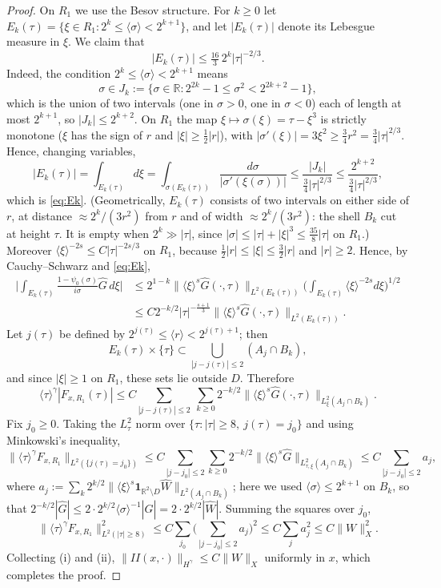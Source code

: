 \documentclass[10pt,a4paper]{amsart}
\newcommand{\R}{\mathbb R}
\newcommand{\ga}{\gamma}
\newcommand{\lan}{\langle}
\newcommand{\ran}{\rangle}
\newcommand{\sig}{\sigma}
\theoremstyle{plain}
\theoremstyle{remark}
\begin{document}
\begin{proof}
On $R_1$ we use the Besov structure. For $k\ge0$ let $E_k(\tau)=\{\xi\in R_1:2^k\le\lan\sig\ran<2^{k+1}\}$, and let $|E_k(\tau)|$ denote its Lebesgue measure in $\xi$. We claim that
\begin{equation}\label{eq:Ek}
|E_k(\tau)|\le \tfrac{16}{3}\,2^{k}|\tau|^{-2/3}.
\end{equation}
Indeed, the condition $2^k\le\lan\sig\ran<2^{k+1}$ means $$\sig\in J_k:=\{\sig\in\R: 2^{2k}-1\le\sig^2<2^{2k+2}-1\},$$ which is the union of two intervals (one in $\sig>0$, one in $\sig<0$) each of length at most $2^{k+1}$, so $|J_k|\le2^{k+2}$. On $R_1$ the map $\xi\mapsto\sig(\xi)=\tau-\xi^3$ is strictly monotone ($\xi$ has the sign of $r$ and $|\xi|\ge\frac12|r|$), with $|\sig'(\xi)|=3\xi^2\ge\frac34r^2=\frac34|\tau|^{2/3}$. Hence, changing variables,
$$
|E_k(\tau)|=\int_{E_k(\tau)}d\xi=\int_{\sig(E_k(\tau))}\frac{d\sig}{|\sig'(\xi(\sig))|}\le\frac{|J_k|}{\frac34|\tau|^{2/3}}\le\frac{2^{k+2}}{\frac34|\tau|^{2/3}},
$$
which is \eqref{eq:Ek}. (Geometrically, $E_k(\tau)$ consists of two intervals on either side of $r$, at distance $\approx2^k/(3r^2)$ from $r$ and of width $\approx2^k/(3r^2)$: the shell $B_k$ cut at height $\tau$. It is empty when $2^k\gg|\tau|$, since $|\sig|\le|\tau|+|\xi|^3\le\frac{35}{8}|\tau|$ on $R_1$.) Moreover $\lan\xi\ran^{-2s}\le C|\tau|^{-2s/3}$ on $R_1$, because $\frac12|r|\le|\xi|\le\frac32|r|$ and $|r|\ge2$. Hence, by Cauchy--Schwarz and \eqref{eq:Ek},
\begin{equation}
\begin{split}
\Big|\int_{E_k(\tau)}\frac{1-\psi_0(\sig)}{i\sig}\widehat G\,d\xi\Big|&\le 2^{1-k}\|\lan\xi\ran^s\widehat G(\cdot,\tau)\|_{L^2(E_k(\tau))}\Big(\int_{E_k(\tau)}\lan\xi\ran^{-2s}d\xi\Big)^{1/2}
\\&\le C2^{-k/2}|\tau|^{-\frac{s+1}3}\|\lan\xi\ran^s\widehat G(\cdot,\tau)\|_{L^2(E_k(\tau))}.
\end{split}
\end{equation}
Let $j(\tau)$ be defined by $2^{j(\tau)}\le\lan r\ran<2^{j(\tau)+1}$; then $$E_k(\tau)\times\{\tau\}\subset\bigcup_{|j-j(\tau)|\le2}(A_j\cap B_k),$$ and since $|\xi|\ge1$ on $R_1$, these sets lie outside $D$. Therefore
$$\lan\tau\ran^\ga|F_{x,R_1}(\tau)|\le C\sum_{|j-j(\tau)|\le2}\ \sum_{k\ge0}2^{-k/2}\|\lan\xi\ran^s\widehat G(\cdot,\tau)\|_{L^2_\xi(A_j\cap B_k)} .$$
Fix $j_0\ge0$. Taking the $L^2_\tau$ norm over $\{\tau:|\tau|\ge8,\ j(\tau)=j_0\}$ and using Minkowski's inequality,
$$\big\|\lan\tau\ran^\ga F_{x,R_1}\big\|_{L^2(\{j(\tau)=j_0\})}\le C\sum_{|j-j_0|\le2}\sum_{k\ge0}2^{-k/2}\|\lan\xi\ran^s\widehat G\|_{L^2_{\tau,\xi}(A_j\cap B_k)}\le C\sum_{|j-j_0|\le2}a_j,$$
where $a_j:=\sum_k2^{k/2}\|\lan\xi\ran^s\mathbf 1_{\R^2\setminus D}\widehat W\|_{L^2(A_j\cap B_k)}$; here we used $\lan\sig\ran\le2^{k+1}$ on $B_k$, so that $2^{-k/2}|\widehat G|\le 2\cdot 2^{k/2}\lan\sig\ran^{-1}|\widehat G|=2\cdot2^{k/2}|\widehat W|$. Summing the squares over $j_0$,
$$\big\|\lan\tau\ran^\ga F_{x,R_1}\big\|_{L^2(|\tau|\ge8)}^2\le C\sum_{j_0}\Big(\sum_{|j-j_0|\le2}a_j\Big)^2\le C\sum_ja_j^2\le C\|W\|_X^2 .$$
Collecting (i) and (ii), $\|II(x,\cdot)\|_{H^\ga}\le C\|W\|_X$ uniformly in $x$, which completes the proof.
\end{proof}
\end{document}
